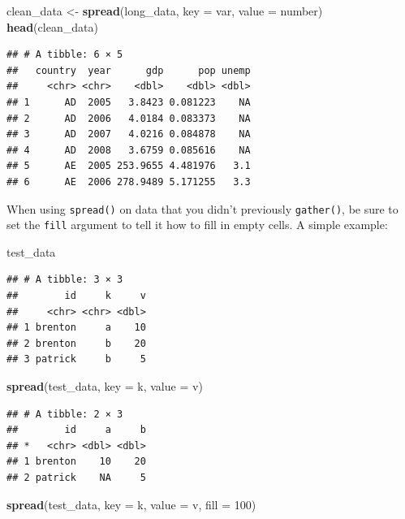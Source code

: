 \documentclass[12pt,oneside,openany]{book}
\newenvironment{Shaded}{\begin{snugshade}}{\end{snugshade}}
\newcommand{\KeywordTok}[1]{\textcolor[rgb]{0.13,0.29,0.53}{\textbf{{#1}}}}
\newcommand{\DataTypeTok}[1]{\textcolor[rgb]{0.13,0.29,0.53}{{#1}}}
\newcommand{\DecValTok}[1]{\textcolor[rgb]{0.00,0.00,0.81}{{#1}}}
\newcommand{\StringTok}[1]{\textcolor[rgb]{0.31,0.60,0.02}{{#1}}}
\newcommand{\NormalTok}[1]{{#1}}
\begin{document}
\begin{Shaded}
\begin{Highlighting}[]
\NormalTok{clean_data <-}\StringTok{ }\KeywordTok{spread}\NormalTok{(long_data,}
                    \DataTypeTok{key =} \NormalTok{var,}
                    \DataTypeTok{value =} \NormalTok{number)}
\KeywordTok{head}\NormalTok{(clean_data)}
\end{Highlighting}
\end{Shaded}

\begin{verbatim}
## # A tibble: 6 × 5
##   country  year      gdp      pop unemp
##     <chr> <chr>    <dbl>    <dbl> <dbl>
## 1      AD  2005   3.8423 0.081223    NA
## 2      AD  2006   4.0184 0.083373    NA
## 3      AD  2007   4.0216 0.084878    NA
## 4      AD  2008   3.6759 0.085616    NA
## 5      AE  2005 253.9655 4.481976   3.1
## 6      AE  2006 278.9489 5.171255   3.3
\end{verbatim}

When using \texttt{spread()} on data that you didn't previously
\texttt{gather()}, be sure to set the \texttt{fill} argument to tell it
how to fill in empty cells. A simple example:

\begin{Shaded}
\begin{Highlighting}[]
\NormalTok{test_data}
\end{Highlighting}
\end{Shaded}

\begin{verbatim}
## # A tibble: 3 × 3
##        id     k     v
##     <chr> <chr> <dbl>
## 1 brenton     a    10
## 2 brenton     b    20
## 3 patrick     b     5
\end{verbatim}

\begin{Shaded}
\begin{Highlighting}[]
\KeywordTok{spread}\NormalTok{(test_data, }\DataTypeTok{key =} \NormalTok{k, }\DataTypeTok{value =} \NormalTok{v)}
\end{Highlighting}
\end{Shaded}

\begin{verbatim}
## # A tibble: 2 × 3
##        id     a     b
## *   <chr> <dbl> <dbl>
## 1 brenton    10    20
## 2 patrick    NA     5
\end{verbatim}

\begin{Shaded}
\begin{Highlighting}[]
\KeywordTok{spread}\NormalTok{(test_data, }\DataTypeTok{key =} \NormalTok{k, }\DataTypeTok{value =} \NormalTok{v, }\DataTypeTok{fill =} \DecValTok{100}\NormalTok{)}
\end{Highlighting}
\end{Shaded}
\end{document}
